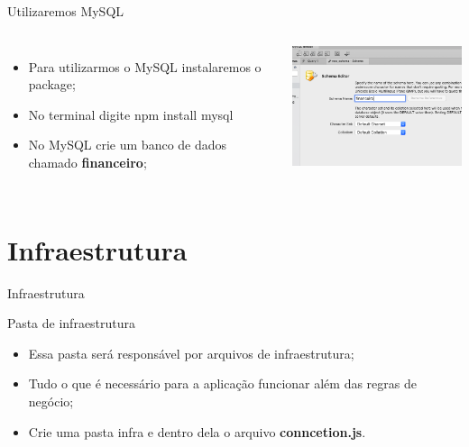 \documentclass{beamer}
\begin{document}
    \begin{frame}[label=lists]{Utilizaremos MySQL}
      \begin{columns}[onlytextwidth]
          \begin{itemize}
            \item Para utilizarmos o MySQL instalaremos o package;
            \item No terminal digite \alert{npm install mysql}
            \item No MySQL crie um banco de dados chamado  \textbf{financeiro}; 
          \end{itemize}
            \includegraphics[width=65mm]{resources/aula6_1.png}
      \end{columns}
    \end{frame}

\section{Infraestrutura}
    \begin{frame}[label=lists]{Infraestrutura}
    \begin{exampleblock}{Pasta de infraestrutura}
        	\begin{itemize}
	\item Essa pasta será responsável por arquivos de infraestrutura;
	\item Tudo o que é necessário para a aplicação funcionar além das regras de negócio;
	\item Crie uma pasta \alert{infra} e dentro dela o arquivo \textbf{conncetion.js}.
        	\end{itemize}
      \end{exampleblock}
    \end{frame}
\end{document}
